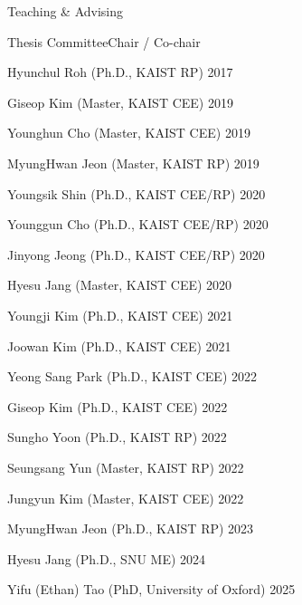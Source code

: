 \begin{rSection}{Teaching \& Advising}
\begin{rSubsection}{Thesis Committee}{}{Chair / Co-chair }{}
  \item Hyunchul Roh (Ph.D., KAIST \ac{RP}) \hfill 2017
  \item Giseop Kim (Master, KAIST \ac{CEE}) \hfill 2019
  \item Younghun Cho (Master, KAIST \ac{CEE}) \hfill 2019
  \item MyungHwan Jeon (Master, KAIST \ac{RP}) \hfill 2019
  \item Youngsik Shin (Ph.D., KAIST \ac{CEE}/\ac{RP}) \hfill 2020
  \item Younggun Cho (Ph.D., KAIST \ac{CEE}/\ac{RP}) \hfill 2020
  \item Jinyong Jeong (Ph.D., KAIST \ac{CEE}/\ac{RP}) \hfill 2020
  \item Hyesu Jang (Master, KAIST \ac{CEE}) \hfill 2020
  \item Youngji Kim (Ph.D., KAIST \ac{CEE}) \hfill 2021
  \item Joowan Kim (Ph.D., KAIST \ac{CEE}) \hfill 2021
  \item Yeong Sang Park (Ph.D., KAIST \ac{CEE}) \hfill 2022
  \item Giseop Kim (Ph.D., KAIST \ac{CEE}) \hfill 2022
  \item Sungho Yoon (Ph.D., KAIST \ac{RP}) \hfill 2022
  \item Seungsang Yun (Master, KAIST \ac{RP}) \hfill 2022
  \item Jungyun Kim (Master, KAIST \ac{CEE}) \hfill 2022
  \item MyungHwan Jeon (Ph.D., KAIST \ac{RP}) \hfill 2023
  \item Hyesu Jang (Ph.D., SNU \ac{ME}) \hfill 2024
  \item Yifu (Ethan) Tao (PhD, University of Oxford) \hfill 2025
\end{rSubsection}

\end{rSection}
